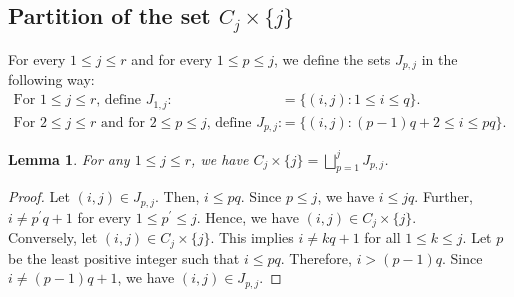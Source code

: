 \documentclass[12pt,reqno]{amsart}
\numberwithin{equation}{section}
\newtheorem{lemma}[theorem]{Lemma}
\theoremstyle{definition}
\begin{document}
\subsection{Partition of the set $C_{j}\times\{j\}$}
For every $1\leq j\leq r$ and for every $1\leq p\leq j$, we define the sets $J_{p,j}$ in the following way:
\begin{align*}
	\text{For $1\leq j\leq r$, define }  J_{1,j}:&=\{(i,j):1\leq i\leq q\}.\\
	\text{For $2\leq j\leq r$ and for $2\leq p\leq j$, define } J_{p,j}:&=\{(i,j):(p-1)q+2\leq i\leq pq\}.
\end{align*}
\begin{lemma}\label{remark 1}
	For any $1\leq j\leq r$, we have $C_{j}\times\{j\}=\bigsqcup_{p=1}^{j}J_{p,j}$.
\end{lemma}
\begin{proof}
	Let $(i,j)\in J_{p,j}$. Then, $i\leq pq$. Since $p\leq j$, we have $i\leq jq$. Further,  $i\neq p^{\prime}q+1$ for every $1\leq p^{\prime}\leq j$. Hence, we have $(i,j)\in C_{j}\times \{j\}$.\\
	Conversely, let $(i,j)\in C_{j}\times\{j\}$. This implies $i\neq kq+1$ for all $1\leq k\leq j$. Let $p$ be the least positive integer such that $i\leq pq$. Therefore, $i>(p-1)q$. Since $i\neq (p-1)q+1$, we have $(i,j)\in J_{p,j}$.
\end{proof}
\end{document}
